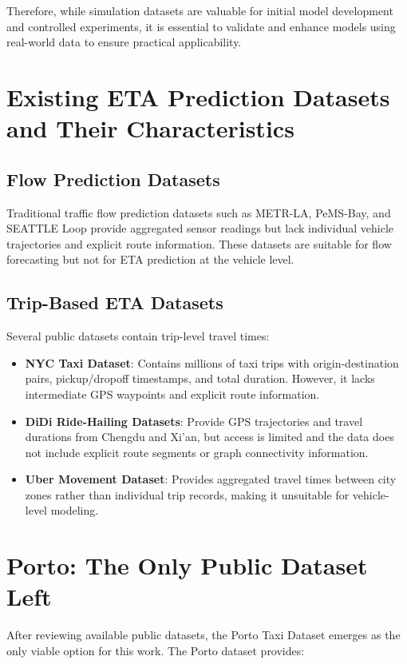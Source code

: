 \documentclass[11pt,a4paper]{article}
\begin{document}
Therefore, while simulation datasets are valuable for initial model development and controlled experiments, it is essential to validate and enhance models using real-world data to ensure practical applicability.

\section{Existing ETA Prediction Datasets and Their Characteristics}

\subsection{Flow Prediction Datasets}

Traditional traffic flow prediction datasets such as METR-LA, PeMS-Bay, and SEATTLE Loop provide aggregated sensor readings but lack individual vehicle trajectories and explicit route information. These datasets are suitable for flow forecasting but not for ETA prediction at the vehicle level.

\subsection{Trip-Based ETA Datasets}

Several public datasets contain trip-level travel times:

\begin{itemize}
    \item \textbf{NYC Taxi Dataset}: Contains millions of taxi trips with origin-destination pairs, pickup/dropoff timestamps, and total duration. However, it lacks intermediate GPS waypoints and explicit route information.
    \item \textbf{DiDi Ride-Hailing Datasets}: Provide GPS trajectories and travel durations from Chengdu and Xi'an, but access is limited and the data does not include explicit route segments or graph connectivity information.
    \item \textbf{Uber Movement Dataset}: Provides aggregated travel times between city zones rather than individual trip records, making it unsuitable for vehicle-level modeling.
\end{itemize}

\section{Porto: The Only Public Dataset Left}

After reviewing available public datasets, the Porto Taxi Dataset emerges as the only viable option for this work. The Porto dataset provides:
\end{document}
